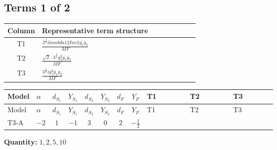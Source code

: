 \documentclass[8pt]{article}
\begin{document}
\begin{landscape}
\subsection*{Terms 1 of 2}
\begin{center}
\begin{tabular}{@{}c >{\raggedright\arraybackslash}p{0.82\linewidth}@{}}
\toprule
Column & Representative term structure \\
\midrule
T1 & \(\displaystyle \frac{3^{\frac{3}{4}} i lambda12Inv1 \overline{y_{1}} \overline{y_{2}}}{MF}\) \\
\midrule
T2 & \(\displaystyle \frac{\sqrt{2} \cdot 3^{\frac{3}{4}} g_{2}^{2} \overline{y_{1}} \overline{y_{2}}}{MF}\) \\
\midrule
T3 & \(\displaystyle \frac{3^{\frac{3}{4}} i g_{1}^{2} \overline{y_{1}} \overline{y_{2}}}{MF}\) \\
\midrule
\bottomrule
\end{tabular}
\end{center}
\smallskip
\tiny
\begin{longtable}{@{}llcccccc >{\raggedright\arraybackslash}p{0.21\linewidth} >{\raggedright\arraybackslash}p{0.21\linewidth} >{\raggedright\arraybackslash}p{0.21\linewidth}@{}}
\toprule
Model & $\alpha$ & $d_{S_1}$ & $Y_{S_1}$ & $d_{S_2}$ & $Y_{S_2}$ & $d_F$ & $Y_F$ & T1 & T2 & T3 \\
\midrule
\endfirsthead
\toprule
Model & $\alpha$ & $d_{S_1}$ & $Y_{S_1}$ & $d_{S_2}$ & $Y_{S_2}$ & $d_F$ & $Y_F$ & T1 & T2 & T3 \\
\midrule
\endhead
T3-A & $-2$ & $1$ & $-1$ & $3$ & $0$ & $2$ & $-\frac{1}{2}$ & \scriptsize\adjustbox{max width=\linewidth}{$\begin{gathered} \frac{3^{\frac{3}{4}} i lambda12Inv1 \overline{y_{1}} \overline{y_{2}}}{6 MF}\end{gathered}$} & \scriptsize\adjustbox{max width=\linewidth}{$\begin{gathered} \frac{\sqrt{2} \cdot 3^{\frac{3}{4}} g_{2}^{2} \overline{y_{1}} \overline{y_{2}}}{6 MF}\end{gathered}$} & \scriptsize\adjustbox{max width=\linewidth}{$\begin{gathered} \frac{3^{\frac{3}{4}} i g_{1}^{2} \overline{y_{1}} \overline{y_{2}}}{8 MF}\end{gathered}$} \\
\midrule
\bottomrule
\end{longtable}
\clearpage
\noindent\textbf{Quantity: }$\mathrm{1,2,5,10}$\par\smallskip

\end{landscape}
\end{document}
